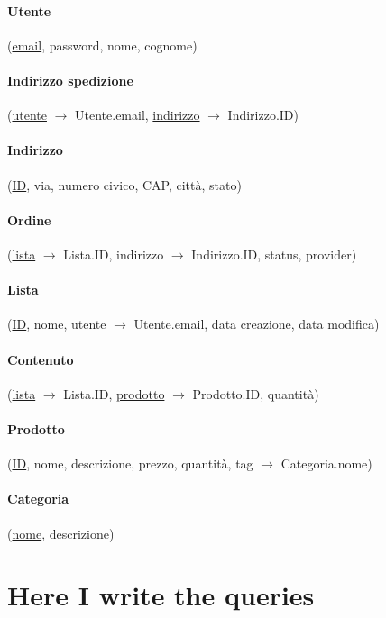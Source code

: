 \documentclass[11pt]{article}
\begin{document}
\paragraph{Utente}(\underline{email}, password, nome, cognome)

\paragraph{Indirizzo spedizione}(\underline{utente} $\rightarrow$ Utente.email,
\underline{indirizzo} $\rightarrow$ Indirizzo.ID)

\paragraph{Indirizzo}(\underline{ID}, via, numero civico, CAP, città, stato)

\paragraph{Ordine}(\underline{lista} $\rightarrow$ Lista.ID, 
indirizzo $\rightarrow$ Indirizzo.ID, status, provider)

\paragraph{Lista}(\underline{ID}, nome, utente $\rightarrow$ Utente.email, data
creazione, data modifica)

\paragraph{Contenuto}(\underline{lista} $\rightarrow$ Lista.ID,
\underline{prodotto} $\rightarrow$ Prodotto.ID, quantità)

\paragraph{Prodotto}(\underline{ID}, nome, descrizione, prezzo, quantità, tag
$\rightarrow$ Categoria.nome)

\paragraph{Categoria}(\underline{nome}, descrizione)

\section{Here I write the queries}
\end{document}
